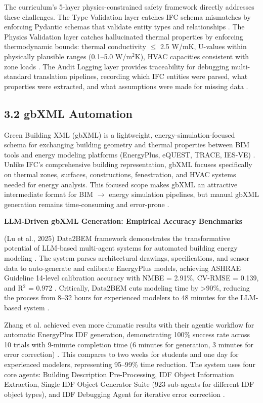 \documentclass[12pt,a4paper]{article}
\begin{document}
The curriculum's 5-layer physics-constrained safety framework directly addresses these challenges. The Type Validation layer catches IFC schema mismatches by enforcing Pydantic schemas that validate entity types and relationships \cite{ref11}. The Physics Validation layer catches hallucinated thermal properties by enforcing thermodynamic bounds: thermal conductivity $\leq$ 2.5 W/mK, U-values within physically plausible ranges (0.1--5.0 W/m$^2$K), HVAC capacities consistent with zone loads \cite{ref58}. The Audit Logging layer provides traceability for debugging multi-standard translation pipelines, recording which IFC entities were parsed, what properties were extracted, and what assumptions were made for missing data \cite{ref59}.

\subsection{3.2 gbXML Automation}

Green Building XML (gbXML) is a lightweight, energy-simulation-focused schema for exchanging building geometry and thermal properties between BIM tools and energy modeling platforms (EnergyPlus, eQUEST, TRACE, IES-VE) \cite{ref60}. Unlike IFC's comprehensive building representation, gbXML focuses specifically on thermal zones, surfaces, constructions, fenestration, and HVAC systems needed for energy analysis. This focused scope makes gbXML an attractive intermediate format for BIM $\rightarrow$ energy simulation pipelines, but manual gbXML generation remains time-consuming and error-prone \cite{ref61}.

\textbf{LLM-Driven gbXML Generation: Empirical Accuracy Benchmarks}

(Lu et al., 2025) Data2BEM framework demonstrates the transformative potential of LLM-based multi-agent systems for automated building energy modeling \cite{ref62}. The system parses architectural drawings, specifications, and sensor data to auto-generate and calibrate EnergyPlus models, achieving ASHRAE Guideline 14-level calibration accuracy with NMBE = 2.91\%, CV-RMSE = 0.139, and R$^2$ = 0.972 \cite{ref63}. Critically, Data2BEM cuts modeling time by >90\%, reducing the process from 8--32 hours for experienced modelers to 48 minutes for the LLM-based system \cite{ref64}.

Zhang et al. achieved even more dramatic results with their agentic workflow for automatic EnergyPlus IDF generation, demonstrating 100\% success rate across 10 trials with 9-minute completion time (6 minutes for generation, 3 minutes for error correction) \cite{ref65}. This compares to two weeks for students and one day for experienced modelers, representing 95--99\% time reduction. The system uses four core agents: Building Description Pre-Processing, IDF Object Information Extraction, Single IDF Object Generator Suite (923 sub-agents for different IDF object types), and IDF Debugging Agent for iterative error correction \cite{ref66}.
\end{document}
